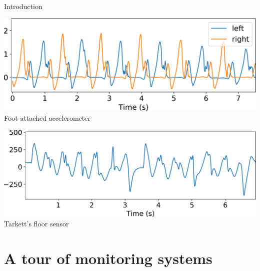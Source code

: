 \documentclass[8pt,t,aspectratio=1610]{beamer}
\newcommand{\ratio}{0.5}
\begin{document}
\begin{frame}{Introduction}{}
\vspace{1cm}
\renewcommand{\ratio}{0.4}
    \centering
    \begin{minipage}{\linewidth}
        \centering
        \begin{minipage}{\ratio\linewidth}
            \centering
            \includegraphics[width=0.91\linewidth]{signal_marche_accelerometre_left_right_epure.pdf}\\
            {\small Foot-attached accelerometer}
        \end{minipage}
        \begin{minipage}{\ratio\linewidth}
            \centering
            \includegraphics[width=\linewidth]{signal_marche_tarkett_epure.pdf}\\
            {\small Tarkett's floor sensor}
        \end{minipage}
    \end{minipage}

\end{frame}

\section{A tour of monitoring systems}
\end{document}
